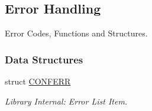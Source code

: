 \hypertarget{group__errors}{
\subsection{Error Handling}
\label{group__errors}
}
Error Codes, Functions and Structures.  


\subsubsection*{Data Structures}
\begin{CompactItemize}
\item 
struct \hyperlink{struct_c_o_n_f_e_r_r}{CONFERR}
\begin{CompactList}\small\item\em Library Internal: Error List Item. \item\end{CompactList}\end{CompactItemize}
